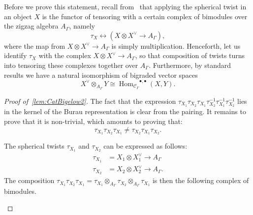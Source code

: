 \documentclass[a4paper]{amsart}
\newcommand{\0}{\mathbf{0}}
\DeclareMathOperator{\Hom}{Hom}
\newcommand{\HOM}{\ensuremath{\Hom_{\mathcal{C}_\Gamma}}}
\theoremstyle{theorem}
\begin{document}
Before we prove this statement, recall from~\cite[Section 2d]{KhS} that applying the spherical twist in an object \(X\) is the functor of tensoring with a certain complex of bimodules over the zigzag algebra \(A_{\Gamma}\), namely
  \[\tau_X \leftrightarrow (X \otimes X^{\vee} \to A_{\Gamma}),\]
  where the map from \(X \otimes X^{\vee} \to A_{\Gamma}\) is simply multiplication.
  Henceforth, let us identify \(\tau_X\) with the complex \(X \otimes X^{\vee} \to A_{\Gamma}\), so that composition of twists turns into tensoring these complexes together over \(A_{\Gamma}\).
  Furthermore, by standard results we have a natural isomorphism of bigraded vector spaces
  \[X^{\vee} \otimes_{A_{\Gamma}} Y \cong \HOM^{\bullet,\bullet}(X,Y).\]
\begin{proof}[Proof of~\cref{lem:CatBigelow2}]
  The fact that the expression \(\tau_{X_1}\tau_{X_2}\tau_{X_1}\tau_{X_2}^{-1}\tau_{X_1}^{-1}\tau_{X_2}^{-1}\) lies in the kernel of the Burau representation is clear from the pairing.
  It remains to prove that it is non-trivial, which amounts to proving that:
  \[
    \tau_{X_1}\tau_{X_2}\tau_{X_1}\neq \tau_{X_2}\tau_{X_1}\tau_{X_2}.
  \]

  The spherical twists $\tau_{X_1}$ and $\tau_{X_2}$ can be expressed as follows:
  \begin{align*}
    \tau_{X_1} &= X_1\otimes X_1^\vee \rightarrow A_\Gamma \\
    \tau_{X_2} &= X_2\otimes X_2^\vee \rightarrow A_{\Gamma}.
  \end{align*}
  The composition $\tau_{X_1} \tau_{X_2} \tau_{X_1} = \tau_{X_1}\otimes_{A_{\Gamma}} \tau_{X_2}\otimes_{A_{\Gamma}} \tau_{X_1}$ is then the following complex of bimodules.
  \begin{center}
  \end{center}



\end{proof}
\end{document}

